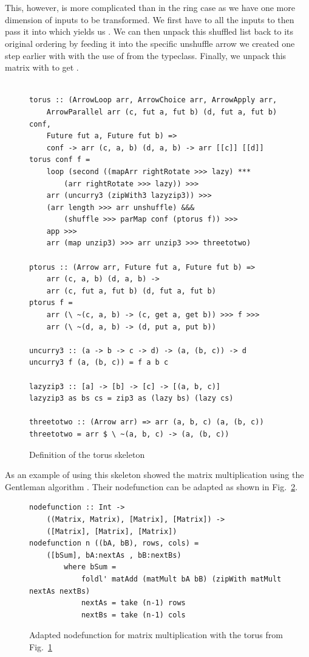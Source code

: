 \\\\
This, however, is more complicated than in the ring case as we have one more dimension of inputs to be transformed. We first have to  all the inputs to then pass it into  which yields us . We can then unpack this shuffled list back to its original ordering by feeding it into the specific unshuffle arrow we created one step earlier with  with the use of  from the  typeclass. Finally, we unpack this matrix \inlinecode{[[[(d, fut a, fut b)]]} with  to get  \inlinecode{([[d]], ([[fut a]], [[fut b]]))}.
\\\\
\begin{figure}[h]
\begin{lstlisting}[frame=htrbl]
torus :: (ArrowLoop arr, ArrowChoice arr, ArrowApply arr,
	ArrowParallel arr (c, fut a, fut b) (d, fut a, fut b) conf,
	Future fut a, Future fut b) =>
	conf -> arr (c, a, b) (d, a, b) -> arr [[c]] [[d]]
torus conf f =
	loop (second ((mapArr rightRotate >>> lazy) ***
		(arr rightRotate >>> lazy)) >>>
	arr (uncurry3 (zipWith3 lazyzip3)) >>>
	(arr length >>> arr unshuffle) &&&
		(shuffle >>> parMap conf (ptorus f)) >>>
	app >>>
	arr (map unzip3) >>> arr unzip3 >>> threetotwo)

ptorus :: (Arrow arr, Future fut a, Future fut b) =>
	arr (c, a, b) (d, a, b) ->
	arr (c, fut a, fut b) (d, fut a, fut b)
ptorus f =
	arr (\ ~(c, a, b) -> (c, get a, get b)) >>> f >>>
	arr (\ ~(d, a, b) -> (d, put a, put b))

uncurry3 :: (a -> b -> c -> d) -> (a, (b, c)) -> d
uncurry3 f (a, (b, c)) = f a b c

lazyzip3 :: [a] -> [b] -> [c] -> [(a, b, c)]
lazyzip3 as bs cs = zip3 as (lazy bs) (lazy cs)

threetotwo :: (Arrow arr) => arr (a, b, c) (a, (b, c))
threetotwo = arr $ \ ~(a, b, c) -> (a, (b, c))
\end{lstlisting}
\caption{Definition of the torus skeleton}
\label{fig:torus}
\end{figure}
As an example of using this skeleton \citep{Loogen2012} showed the matrix multiplication using the Gentleman algorithm \citep{Gentleman1978}. Their nodefunction can be adapted as shown in Fig.~\ref{fig:torusMatMult}.
\begin{figure}[h]
\begin{lstlisting}[frame=htrbl]
nodefunction :: Int ->
	((Matrix, Matrix), [Matrix], [Matrix]) ->
	([Matrix], [Matrix], [Matrix])
nodefunction n ((bA, bB), rows, cols) =
	([bSum], bA:nextAs , bB:nextBs)
		where bSum =
			foldl' matAdd (matMult bA bB) (zipWith matMult nextAs nextBs)
			nextAs = take (n-1) rows
			nextBs = take (n-1) cols
\end{lstlisting}
\caption{Adapted nodefunction for matrix multiplication with the torus from Fig.~\ref{fig:torus}}
\label{fig:torusMatMult}
\end{figure}
